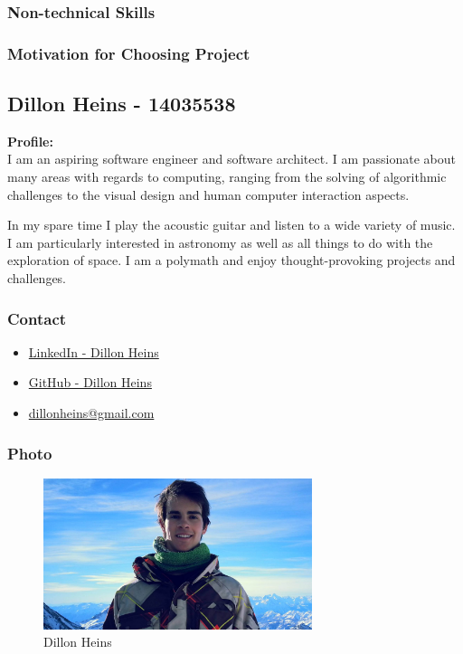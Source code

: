 \documentclass{article}
\begin{document}
	\subsubsection{Non-technical Skills}
	
	\subsubsection{Motivation for Choosing Project}
	
	\cleardoublepage
	
	\subsection{Dillon Heins - 14035538}
	\textbf{Profile:}\\
	I am an aspiring software engineer and software architect. I am passionate about many areas with regards to computing, ranging from the solving of algorithmic challenges to the visual design and human computer interaction aspects.
	
	In my spare time I play the acoustic guitar and listen to a wide variety of music. I am particularly interested in astronomy as well as all things to do with the exploration of space. I am a polymath and enjoy thought-provoking projects and challenges.
	\subsubsection{Contact}
		\begin{itemize}
			\item \href{https://za.linkedin.com/in/dillon-heins-54275810a}{LinkedIn - Dillon Heins}
			\item \href{https://github.com/DillonHeins}{GitHub - Dillon Heins}
			\item \href{mailto:dillonheins@gmail.com}{dillonheins@gmail.com}
		\end{itemize}
	\subsubsection{Photo}
		\begin{figure}[H]
			\centering
			\includegraphics[width=0.7\textwidth]{../dillon.jpg}
			\caption{Dillon Heins}
		\end{figure}
\end{document}
